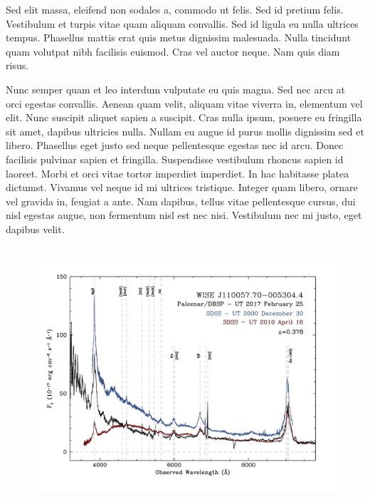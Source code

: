 \documentclass{emulateapj}
\begin{document}
Sed elit massa, eleifend non sodales a, commodo ut felis. Sed id
pretium felis. Vestibulum et turpis vitae quam aliquam convallis. Sed
id ligula eu nulla ultrices tempus. Phasellus mattis erat quis metus
dignissim malesuada. Nulla tincidunt quam volutpat nibh facilisis
euismod. Cras vel auctor neque. Nam quis diam risus.

Nunc semper quam et leo interdum vulputate eu quis magna. Sed nec arcu
at orci egestas convallis. Aenean quam velit, aliquam vitae viverra
in, elementum vel elit. Nunc suscipit aliquet sapien a suscipit. Cras
nulla ipsum, posuere eu fringilla sit amet, dapibus ultricies
nulla. Nullam eu augue id purus mollis dignissim sed et
libero. Phasellus eget justo sed neque pellentesque egestas nec id
arcu. Donec facilisis pulvinar sapien et fringilla. Suspendisse
vestibulum rhoncus sapien id laoreet. Morbi et orci vitae tortor
imperdiet imperdiet. In hac habitasse platea dictumst. Vivamus vel
neque id mi ultrices tristique. Integer quam libero, ornare vel
gravida in, feugiat a ante. Nam dapibus, tellus vitae pellentesque
cursus, dui nisl egestas augue, non fermentum nisl est nec
nisi. Vestibulum nec mi justo, eget dapibus velit.
\begin{figure}
  \includegraphics[width=17.00cm, height=9.50cm, trim=0.0cm 0.0cm 0.0cm 0.0cm, clip]
  {../plots/spectra/w1100m0052_sdss.jpg}
  \centering
  \caption[]{  } 
\label{fig:w1100m0052_sdss}
\end{figure}
\end{document}
